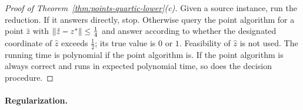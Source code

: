 \begin{proof}[Proof of Theorem~\ref{thm:points-quartic-lower}(c)]
Given a source instance, run the reduction. If it answers directly, stop.
Otherwise query the point algorithm for a point $\hat z$ with
$\left\lVert\hat z-z^*\right\rVert\le\frac14$ and answer according to whether the designated
coordinate of $\hat z$ exceeds $\frac12$; its true value is $0$ or $1$.
Feasibility of $\hat z$ is not used. The running time is polynomial if the
point algorithm is. If the point algorithm is always correct and runs in
expected polynomial time, so does the decision procedure.
\end{proof}

\paragraph{Regularization.}

